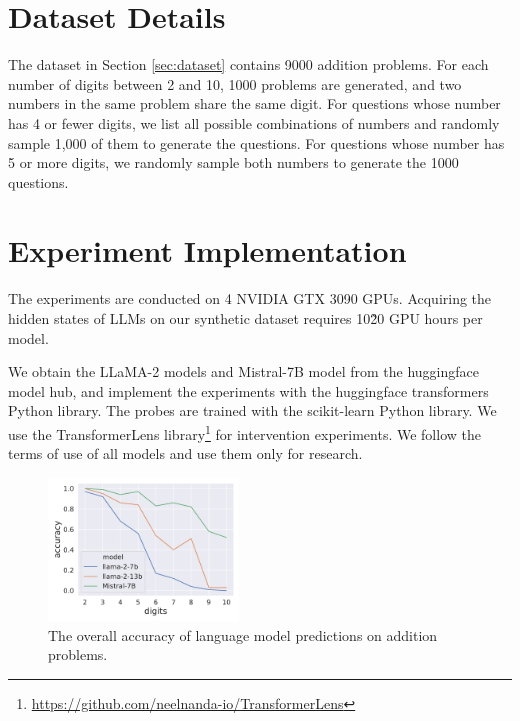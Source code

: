 \documentclass[11pt]{article}
\begin{document}
\section{Dataset Details}
\label{sec:appendix_dataset}
The dataset in Section \ref{sec:dataset} contains 9000 addition problems.
For each number of digits between 2 and 10, 1000 problems are generated, and two numbers in the same problem share the same digit.
For questions whose number has 4 or fewer digits, we list all possible combinations of numbers and randomly sample 1,000 of them to generate the questions.
For questions whose number has 5 or more digits, we randomly sample both numbers to generate the 1000 questions.

\section{Experiment Implementation}
\label{sec:appendix_implementation}
The experiments are conducted on 4 NVIDIA GTX 3090 GPUs.
Acquiring the hidden states of LLMs on our synthetic dataset requires 10\~20 GPU hours per model.

We obtain the LLaMA-2 models and Mistral-7B model from the huggingface model hub, and implement the experiments with the huggingface transformers Python library.
The probes are trained with the scikit-learn Python library.
We use the TransformerLens library\footnote{\url{https://github.com/neelnanda-io/TransformerLens}} for intervention experiments.
We follow the terms of use of all models and use them only for research.

\begin{figure}[ht]
    \centering
    \includegraphics[width=0.45\textwidth]{figures/appendix/overall_accuracy.pdf}
    \caption{The overall accuracy of language model predictions on addition problems.}
    \label{fig:appendix_overall_accuracy}
\end{figure}
\end{document}
